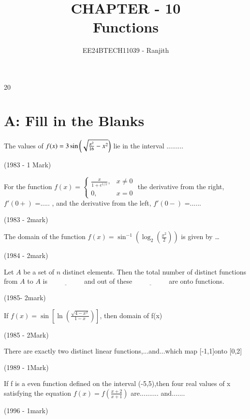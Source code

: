 \documentclass[journal,12pt,twocolumn]{IEEEtran}
\theoremstyle{remark}
\begin{document}

\vspace{3cm}

\title{CHAPTER - 10\\Functions}
\author{EE24BTECH11039 - Ranjith}
\maketitle
\newpage
\bigskip

\renewcommand{\thefigure}{\theenumi}
\renewcommand{\thetable}{\theenumi}

\fontsize{18}
{20}\selectfont
\section{A: Fill in the Blanks}


\begin{enumerate}
\item The values of $f(x)=3\sin\left(\sqrt{\frac{\pi^2}{16}-x^2}\right) $ lie in the interval .........


\hfill{(1983 - 1 Mark)}


 \item For the function $f(x) = \begin{cases} \frac{x}{1 + e^{1/x}}, & x \neq 0 \\ 0, & x = 0 \end{cases} $
the derivative from the right, $f'(0+)$ =..... , and the derivative from the left, $f'(0-)$ =......


 
\hfill{(1983 - 2mark)}

\item{The domain of the function $f(x) =\sin^{-1}\left(\log_{2}\left(\frac{x^{2}}{2}\right)\right)$ is given by \ldots \


\hfill 
{(1984 - 2mark)}

\item Let \( A \) be a set of \( n \) distinct elements. Then the total number of distinct functions from \( A \) to \( A \) is \( \underline{\hspace{2cm}} \) and out of these \( \underline{\hspace{2cm}} \) are onto functions.

\hfill
{(1985- 2mark)}


\item If $f(x) = \sin \left[ \ln \left( \frac{\sqrt{4 - x^{2}}}{1 - x} \right) \right]$, { then domain of } f(x)  \\ 


\hfill
{(1985 - 2Mark)}

 
\item There are exactly two distinct linear functions,...and...which map [-1,1]onto [0,2]

\hfill
{(1989 - 1Mark)}



 \item If f is a even function defined on the 
interval (-5,5),then four real values of x 
satisfying the equation $f(x)=f({\frac{x+2}{x+1}})$
are.......... and.......


\hfill{(1996 - 1mark)}
}
\end{enumerate}
\end{document}
